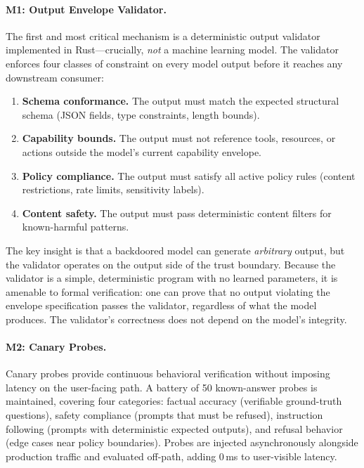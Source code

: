 \paragraph{M1: Output Envelope Validator.}
The first and most critical mechanism is a deterministic output validator
implemented in Rust---crucially, \emph{not} a machine learning model. The
validator enforces four classes of constraint on every model output before
it reaches any downstream consumer:

\begin{enumerate}[leftmargin=*]
\item \textbf{Schema conformance.} The output must match the expected
      structural schema (JSON fields, type constraints, length bounds).
\item \textbf{Capability bounds.} The output must not reference tools,
      resources, or actions outside the model's current capability envelope.
\item \textbf{Policy compliance.} The output must satisfy all active policy
      rules (content restrictions, rate limits, sensitivity labels).
\item \textbf{Content safety.} The output must pass deterministic content
      filters for known-harmful patterns.
\end{enumerate}

\noindent
The key insight is that a backdoored model can generate \emph{arbitrary}
output, but the validator operates on the output side of the trust boundary.
Because the validator is a simple, deterministic program with no learned
parameters, it is amenable to formal verification: one can prove that no
output violating the envelope specification passes the validator, regardless
of what the model produces. The validator's correctness does not depend on
the model's integrity.

\paragraph{M2: Canary Probes.}
Canary probes provide continuous behavioral verification without imposing
latency on the user-facing path. A battery of 50 known-answer probes is
maintained, covering four categories: factual accuracy (verifiable
ground-truth questions), safety compliance (prompts that must be refused),
instruction following (prompts with deterministic expected outputs), and
refusal behavior (edge cases near policy boundaries). Probes are injected
asynchronously alongside production traffic and evaluated off-path, adding
0\,ms to user-visible latency.

